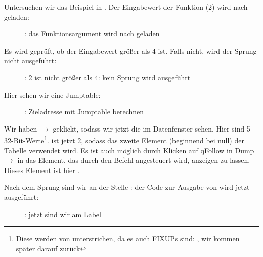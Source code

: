 \clearpage
\mysubparagraph{\olly}
\myindex{\olly}

Untersuchen wir das Beispiel in \olly.
Der Eingabewert der Funktion (2) wird nach \EAX geladen: 

\begin{figure}[H]
\centering
{}
\caption{\olly: das Funktionsargument wird nach \EAX geladen}
\label{fig:switch_lot_olly1}
\end{figure}

\clearpage
Es wird geprüft, ob der Eingabewert größer als 4 ist.
Falls nicht, wird der  Sprung nicht ausgeführt:
\begin{figure}[H]
\centering
{}
\caption{\olly: 2 ist nicht größer als 4: kein Sprung wird ausgeführt}
\label{fig:switch_lot_olly2}
\end{figure}

\clearpage
Hier sehen wir eine Jumptable:

\begin{figure}[H]
\centering
{}
\caption{\olly: Zieladresse mit Jumptable berechnen}
\label{fig:switch_lot_olly3}
\end{figure}
Wir haben $\rightarrow$  geklickt, sodass wir jetzt die  im
Datenfenster sehen. Hier sind 5 32-Bit-Werte\footnote{Diese werden von \olly unterstrichen, da
es auch FIXUPs sind: , wir kommen später darauf zurück}.
\ECX ist jetzt 2, sodass das zweite Element (beginnend bei null) der Tabelle verwendet wird.
Es ist auch möglich durch Klicken auf q{Follow in Dump} $\rightarrow$ 
 in \olly das Element, das durch den \JMP Befehl angesteuert wird, anzeigen zu lassen. Dieses Element
ist hier .

\clearpage
Nach dem Sprung sind wir an der Stelle : der Code zur Ausgabe von  wird jetzt ausgeführt:

\begin{figure}[H]
\centering
{}
\caption{\olly: jetzt sind wir am  Label}
\label{fig:switch_lot_olly4}
\end{figure}

